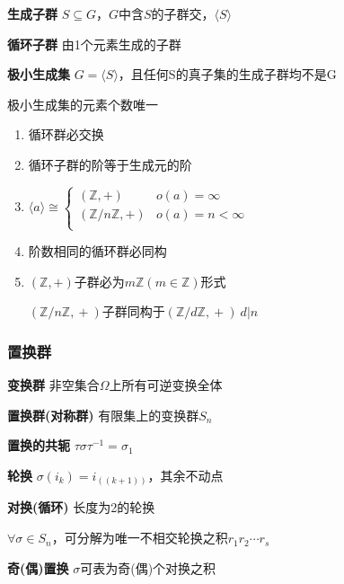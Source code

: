 \documentclass[a4paper,10pt]{ctexart}
\newcommand*{\setZ}{\mathbb{Z}}
\newcommand*{\gengroup}[1]{\langle #1 \rangle}
\begin{document}
\begin{multicols}{3}
    \textbf{生成子群} $S \!\subseteq\! G$，$G$中含$S$的子群交，$\gengroup{S}$

    \textbf{循环子群} 由1个元素生成的子群

    \textbf{极小生成集} $G \! = \! \gengroup{S}$，且任何S的真子集的生成子群均不是G

    极小生成集的元素个数唯一

    \begin{theorem}[循环群性质]
        \hfil

        \begin{enumerate}
            \item 循环群必交换
            \item 循环子群的阶等于生成元的阶
            \item $\gengroup{a} \cong \begin{cases}
                          (\setZ, +)        & o(a)=\infty       \\
                          (\setZ/n\setZ, +) & o(a) = n < \infty \\
                      \end{cases}$
            \item 阶数相同的循环群必同构
            \item $(\setZ, +)\!$子群必为$m\setZ(m \!\in\! \setZ)$形式

                  $(\setZ/n\setZ,\! +)\!$子群同构于$\!(\setZ/d\setZ,\! +)\  d|n$
        \end{enumerate}
    \end{theorem}

    \subsubsection{置换群}

    \textbf{变换群} 非空集合$\Omega$上所有可逆变换全体

    \textbf{置换群(对称群)} 有限集上的变换群$S_n$

    \textbf{置换的共轭} $\tau \sigma \tau^{-1} = \sigma_1$

    \textbf{轮换} $\sigma(i_k) = i_{((k+1))}$，其余不动点

    \textbf{对换(循环)} 长度为2的轮换

    \begin{theorem}[标准轮换分解]
        $\forall \sigma \in S_n$，可分解为唯一不相交轮换之积$r_1 r_2 \cdots r_s$
    \end{theorem}

    \textbf{奇(偶)置换} $\sigma$可表为奇(偶)个对换之积


\end{multicols}
\end{document}
